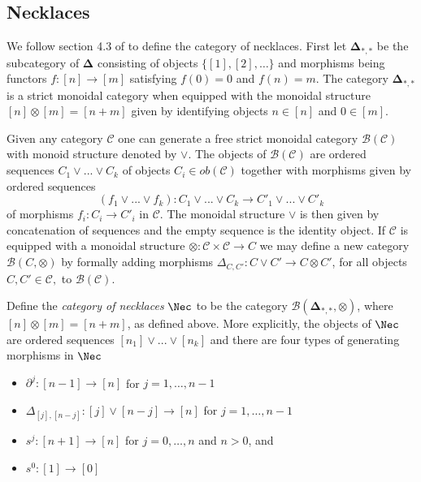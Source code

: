 \subsection{Necklaces} We follow section 4.3 of \cite{galvez2020hopf} to define the category of necklaces. First let $\mathbf{\Delta}_{*,*}$ be the subcategory of $\mathbf{\Delta}$ consisting of objects $\{ [1], [2],\dots\}$ and morphisms being functors $f \colon [n] \to [m]$ satisfying $f(0)=0$ and $f(n)=m$. The category $\mathbf{\Delta}_{*,*}$ is a strict monoidal category when equipped with the monoidal structure $[n] \otimes [m]= [n+m]$ given by identifying objects $n \in [n]$ and $0 \in [m]$.

Given any category $\mathcal{C}$ one can generate a free strict monoidal category $\mathcal{B}(\mathcal{C})$ with monoid structure denoted by $\vee$. The  objects of $\mathcal{B}(\mathcal{C})$ are ordered sequences $C_1 \vee ... \vee C_k$ of objects $C_i \in ob(\mathcal{C})$ together with morphisms given by ordered sequences $$(f_1 \vee ... \vee f_k) \colon C_1 \vee ... \vee C_k \to C'_1 \vee ... \vee C'_k$$ of morphisms $f_i \colon C_i \to C'_i$ in $\mathcal{C}.$ The monoidal structure $\vee$ is then given by concatenation of sequences and the empty sequence is the identity object. If $\mathcal{C}$ is equipped with a monoidal structure $\otimes \colon \mathcal{C} \times \mathcal{C} \to C$ we may define a new category $\mathcal{B}(C, \otimes)$ by formally adding morphisms $\Delta_{C,C'} \colon C \vee C' \to C \otimes C'$, for all objects $C, C' \in \mathcal{C},$ to $\mathcal{B}(\mathcal{C}).$
 
Define the \textit{category of necklaces} $\Nec$ to be the category  $\mathcal{B}(\mathbf{\Delta}_{*,*}, \otimes)$, where $[n] \otimes [m]=[n+m]$, as defined above. More explicitly, the objects of $\Nec$ are ordered sequences $[n_1] \vee ... \vee[n_k]$ and there are four types of generating morphisms in $\Nec$
\begin{itemize}
\item $\partial^j \colon [n-1] \to  [n] $
for $j=1,\dots,n-1$
\item $\Delta_{[j],[n-j]} \colon  [j]\vee [n-j] \to [n]$ for $j=1,\dots,n-1$
\item $ s^j \colon [n+1] \to [n]$ for $j=0,\dots,n$ and $n>0$, and 
\item $s^0 \colon [1] \to [0]$
\end{itemize}

